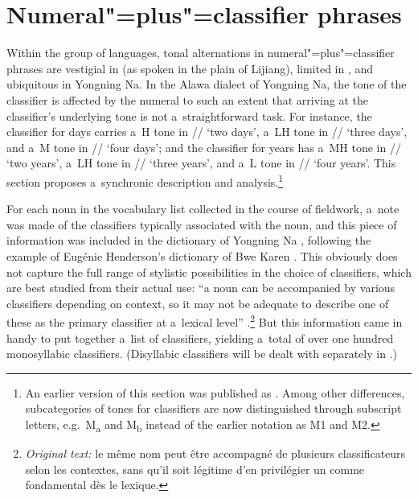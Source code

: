 

\section{Numeral"=plus"=classifier phrases}
\label{sec:numeralplusclassifierphrases}

Within the group of  languages, tonal alternations in numeral"=plus"=classifier phrases are
vestigial in  (as spoken in the plain of Lijiang), limited in , and ubiquitous in Yongning
Na. In the Alawa dialect of Yongning Na, the tone of the
classifier is affected by the numeral to such an extent that arriving at the classifier's underlying tone is not a~straightforward task. For instance, the classifier for days carries a~H tone in // ‘two
days’, a~LH tone in // ‘three days’, and a~M tone in // ‘four days’; and the
classifier for years has a~MH tone in // ‘two years’, a~LH tone in //
‘three years’, and a~L tone in // ‘four years’. This section proposes a~synchronic description and analysis.\footnote{An earlier version of this section was published as
  \citet{michaud2013d}. Among other differences, subcategories of tones for classifiers are now distinguished through subscript letters, e.g.~M\textsubscript{a} and M\textsubscript{b} instead of the earlier
  notation as M1 and M2.}

For each noun in the vocabulary list collected in the course of fieldwork, a~note was made of the
classifiers typically associated with the noun, and this piece of information was included in the dictionary of Yongning Na \citep{michauddict2015}, following the example of Eugénie Henderson’s dictionary
of Bwe Karen \citep{henderson1997}. This obviously does not capture the full range of stylistic possibilities in
the choice of classifiers, which are best studied from their actual use: “a noun can be accompanied
by various classifiers depending on context, 
so it may not be adequate to describe one
of these as the primary classifier at a~lexical level” \citep[167]{francois2000a}.\footnote{\textit{Original text:} le même nom peut être accompagné de plusieurs classificateurs selon les contextes, sans qu'il soit légitime d'en privilégier un comme fondamental dès le lexique.} But this information came in handy to put together a~list of classifiers, yielding a~total of over one hundred monosyllabic classifiers. (Disyllabic classifiers will be dealt with
separately in
.) 


